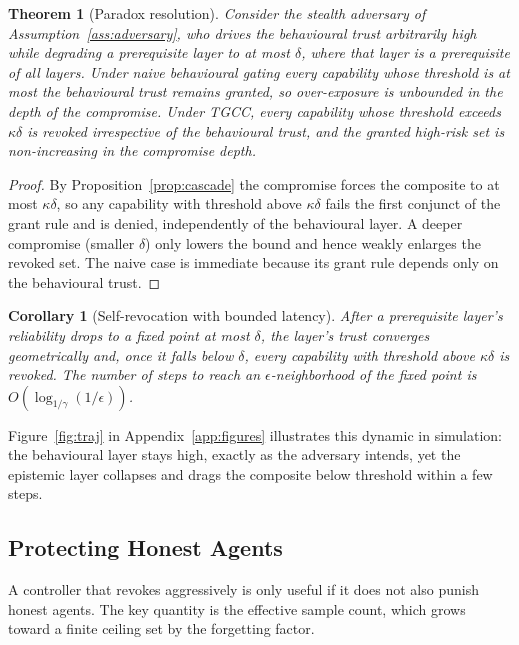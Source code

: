 \documentclass[sigconf,anonymous]{acmart}
\theoremstyle{plain}
\newtheorem{theorem}{Theorem}
\newtheorem{corollary}{Corollary}
\theoremstyle{definition}
\theoremstyle{remark}
\begin{document}
\begin{theorem}[Paradox resolution]
\label{thm:paradox}
Consider the stealth adversary of Assumption~\ref{ass:adversary}, who drives the
behavioural trust arbitrarily high while degrading a prerequisite layer to at most
$\delta$, where that layer is a prerequisite of all layers. Under naive behavioural gating
every capability whose threshold is at most the behavioural trust remains granted, so
over-exposure is unbounded in the depth of the compromise. Under TGCC, every capability
whose threshold exceeds $\kappa\delta$ is revoked irrespective of the behavioural trust,
and the granted high-risk set is non-increasing in the compromise depth.
\end{theorem}
\begin{proof}
By Proposition~\ref{prop:cascade} the compromise forces the composite to at most
$\kappa\delta$, so any capability with threshold above $\kappa\delta$ fails the first
conjunct of the grant rule and is denied, independently of the behavioural layer. A deeper
compromise (smaller $\delta$) only lowers the bound and hence weakly enlarges the revoked
set. The naive case is immediate because its grant rule depends only on the behavioural
trust.
\end{proof}

\begin{corollary}[Self-revocation with bounded latency]
\label{cor:revoke}
After a prerequisite layer's reliability drops to a fixed point at most $\delta$, the
layer's trust converges geometrically and, once it falls below $\delta$, every capability
with threshold above $\kappa\delta$ is revoked. The number of steps to reach an
$\epsilon$-neighborhood of the fixed point is $O(\log_{1/\gamma}(1/\epsilon))$.
\end{corollary}

Figure~\ref{fig:traj} in Appendix~\ref{app:figures} illustrates this dynamic in
simulation: the behavioural layer stays high, exactly as the adversary intends, yet the
epistemic layer collapses and drags the composite below threshold within a few steps.

\subsection{Protecting Honest Agents}
A controller that revokes aggressively is only useful if it does not also punish honest
agents. The key quantity is the effective sample count, which grows toward a finite
ceiling set by the forgetting factor.
\end{document}
